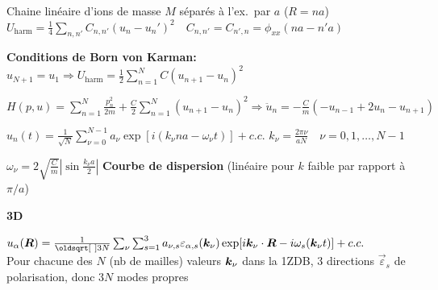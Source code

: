\begin{squishlist}
    \item Chaine linéaire d'ions de masse $M$ séparés à l'ex.\ par $a$ ($R = na$)\\
    $U_{\text{harm}} = \frac{1}{4} \sum_{n,n'} C_{n,n'}(u_n - u_n')^2 \quad C_{n,n'} = C_{n',n} = \phi_{xx}(na - n'a)$
    \item \textbf{Conditions de Born von Karman:} $u_{N+1} = u_1 \Longrightarrow U_{\text{harm}} = \frac{1}{2}\sum_{n=1}^{N}C(u_{n+1}-u_n)^2$
    \item $H(p,u) = \sum_{n=1}^{N}\frac{p^2_n}{2m} + \frac{C}{2}\sum_{n=1}^{N}(u_{n+1} - u_n)^2 \Longrightarrow \ddot{u}_n = -\frac{C}{m}(-u_{n-1}+2u_n - u_{n+1})$
    \item $u_n(t) = \frac{1}{\sqrt{N}} \sum_{\nu=0}^{N-1}a_{\nu} \exp[ i (k_{\nu}na - \omega_{\nu}t)] + c.c.$ \quad $k_{\nu} = \frac{2\pi \nu}{aN} \quad \nu = 0,1,\ldots, N-1$ 
    \item $\omega_{\nu} = 2 \sqrt{\frac{C}{m}} \left| \sin \frac{k_{\nu}a}{2}\right|$ \textbf{Courbe de dispersion} (linéaire pour $k$ faible par rapport à $\pi/a$)

    \squishline

    \textbf{3D}
    \item $u_{\alpha}(\vR) = \frac{1}{\sqrt{3N}}\sum_{\nu}\sum_{s=1}^{3} a_{\nu,s} \varepsilon_{\alpha,s}(\vk_{\nu}) \exp [i \vk_{\nu} \cdot \vR - i \omega_s(\vk_{\nu}t)] + c.c.$ \\ 
    Pour chacune des $N$ (nb de mailles) valeurs $\bm{k}_{\nu}$ dans la 1ZDB, 3 directions $\vec{\varepsilon}_s$ de polarisation, donc $3N$ modes propres

\end{squishlist}

